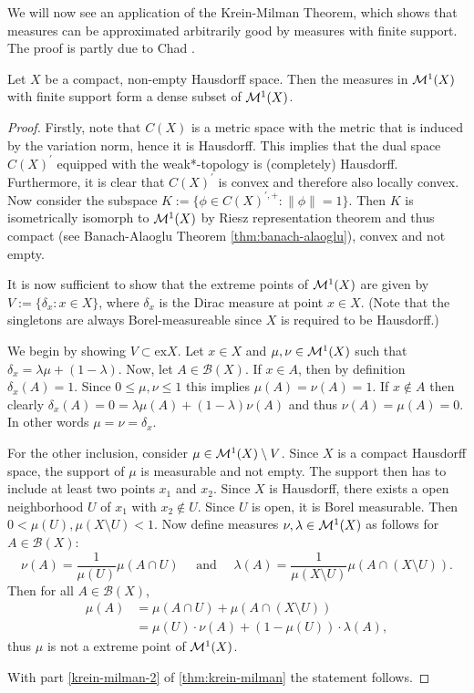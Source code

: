 We will now see an application of the Krein-Milman Theorem, which shows that measures can be approximated arbitrarily good by measures with finite support. The proof is partly due to Chad \cite{chad}.
\begin{theorem}\label{thm:finite-support}
	Let $X$ be a compact, non-empty Hausdorff space. Then the measures in $\mathcal{M}^1(X)$ with finite support form a dense subset of $\mathcal{M}^1(X)$.
\end{theorem}
\begin{proof}
	Firstly, note that $C(X)$ is a metric space with the metric that is induced by the variation norm, hence it is Hausdorff. This implies that the dual space $C(X)^\prime$ equipped with the weak*-topology is (completely) Hausdorff. Furthermore, it is clear that $C(X)^\prime$ is convex and therefore also locally convex. Now consider the subspace $K:=\{\phi\in C(X)^{\prime,+}\colon \|\phi\|=1\}$. Then $K$ is isometrically isomorph to $\mathcal{M}^1(X)$ by Riesz representation theorem and thus compact (see Banach-Alaoglu Theorem \ref{thm:banach-alaoglu}), convex and not empty.
	
	It is now sufficient to show that the extreme points of $\mathcal{M}^1(X)$ are given by $V:=\{\delta_x:x\in X\}$, where $\delta_x$ is the Dirac measure at point $x\in X$. (Note that the singletons are always Borel-measureable since $X$ is required to be Hausdorff.) 
	
	We begin by showing $V\subset \mathrm{ex}X$. Let $x\in X$ and $\mu,\nu\in \mathcal{M}^1(X)$ such that $\delta_x=\lambda \mu+(1-\lambda)$. Now, let $A\in \mathcal{B}(X)$. If $x\in A$, then by definition $\delta_x(A)=1$. Since $0\leq \mu,\nu\leq 1$ this implies $\mu(A)=\nu(A)=1$. If $x\not\in A$ then clearly $\delta_x(A)=0=\lambda\mu(A)+(1-\lambda)\nu(A)$ and thus $\nu(A)=\mu(A)=0$. In other words $\mu=\nu=\delta_x$.
	
	For the other inclusion, consider $\mu\in \mathcal{M}^1(X)\setminus V$. Since $X$ is a compact Hausdorff space, the support of $\mu$ is measurable and not empty. The support then has to include at least two points $x_1$ and $x_2$. Since $X$ is Hausdorff, there exists a open neighborhood $U$ of $x_1$ with $x_2\not\in U$. Since $U$ is open, it is Borel measurable. Then $0<\mu(U),\mu(X\setminus U)<1$. Now define measures $\nu,\lambda\in \mathcal{M}^1(X)$ as follows for $A\in \mathcal{B}(X)$:
	\[
	\nu(A)=\frac{1}{\mu(U)}\mu(A\cap U)\quad\text{ and }\quad \lambda(A)=\frac{1}{\mu(X\setminus U)}\mu(A\cap (X\setminus U)).
	\]
	Then for all $A\in \mathcal{B}(X)$,
	\begin{align*}
	\mu(A)&=\mu(A\cap U)+\mu(A\cap (X\setminus U))\\
	&=\mu(U)\cdot \nu(A)+(1-\mu(U))\cdot \lambda(A),
	\end{align*}
	thus $\mu$ is not a extreme point of $\mathcal{M}^1(X)$.
	
	With part \ref{krein-milman-2} of \autoref{thm:krein-milman} the statement follows.
\end{proof}